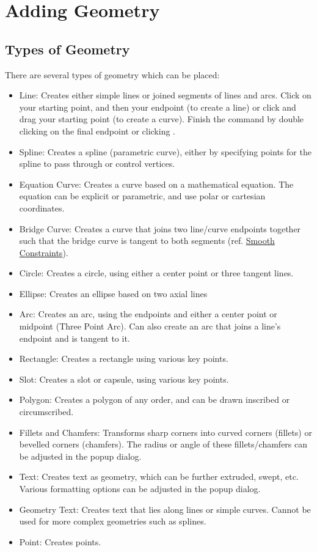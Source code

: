 \section{Adding Geometry}

\subsection{Types of Geometry}

\cbstart
{}

There are several types of geometry which can be placed:

\begin{itemize}
\item Line: Creates either simple lines or joined segments of lines and arcs. Click on your starting point, and then your endpoint (to create a line) or click and drag your starting point (to create a curve). Finish the command by double clicking on the final endpoint or clicking .
\item Spline: Creates a spline (parametric curve), either by specifying points for the spline to pass through or control vertices. 
\item Equation Curve: Creates a curve based on a mathematical equation. The equation can be explicit or parametric, and use polar or cartesian coordinates.
\item Bridge Curve: Creates a curve that joins two line/curve endpoints together such that the bridge curve is tangent to both segments (ref. \hyperref[subchap:constraint-types]{Smooth Constraints}).
\item Circle: Creates a circle, using either a center point or three tangent lines.
\item Ellipse: Creates an ellipse based on two axial lines
\item Arc: Creates an arc, using the endpoints and either a center point or midpoint (Three Point Arc). Can also create an arc that joins a line's endpoint and is tangent to it.
\item Rectangle: Creates a rectangle using various key points.
\item Slot: Creates a slot or capsule, using various key points.
\item Polygon: Creates a polygon of any order, and can be drawn inscribed or circumscribed.
\item Fillets and Chamfers: Transforms sharp corners into curved corners (fillets) or bevelled corners (chamfers). The radius or angle of these fillets/chamfers can be adjusted in the popup dialog.
\item Text: Creates text as geometry, which can be further extruded, swept, etc. Various formatting options can be adjusted in the popup dialog.
\item Geometry Text: Creates text that lies along lines or simple curves. Cannot be used for more complex geometries such as splines.
\item Point: Creates points.
\cbend

\end{itemize}

